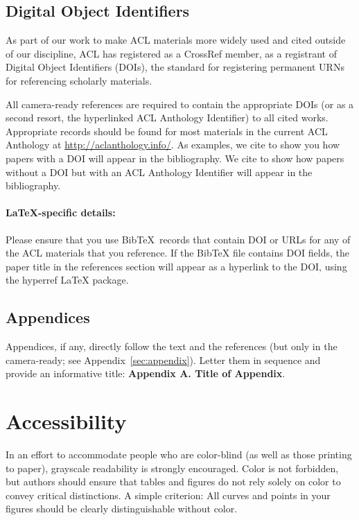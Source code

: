 \documentclass[11pt,a4paper]{article}
\begin{document}
\subsection{Digital Object Identifiers}
As part of our work to make ACL materials more widely used and cited outside of our discipline, ACL has registered as a CrossRef member, as a registrant of Digital Object Identifiers (DOIs), the standard for registering permanent URNs for referencing scholarly materials.

All camera-ready references are required to contain the appropriate DOIs (or as a second resort, the hyperlinked ACL Anthology Identifier) to all cited works.
Appropriate records should be found for most materials in the current ACL Anthology at \url{http://aclanthology.info/}.
As examples, we cite \citep{goodman-etal-2016-noise} to show you how papers with a DOI will appear in the bibliography.
We cite \citep{harper-2014-learning} to show how papers without a DOI but with an ACL Anthology Identifier will appear in the bibliography.

\paragraph{\LaTeX-specific details:}
Please ensure that you use Bib\TeX\ records that contain DOI or URLs for any of the ACL materials that you reference.
If the Bib\TeX{} file contains DOI fields, the paper title in the references section will appear as a hyperlink to the DOI, using the hyperref \LaTeX{} package.


\subsection{Appendices}
Appendices, if any, directly follow the text and the
references (but only in the camera-ready; see Appendix~\ref{sec:appendix}).
Letter them in sequence and provide an informative title:
\textbf{Appendix A. Title of Appendix}.

\section{Accessibility}
\label{ssec:accessibility}

In an effort to accommodate people who are color-blind (as well as those printing to paper), grayscale readability is strongly encouraged.
Color is not forbidden, but authors should ensure that tables and figures do not rely solely on color to convey critical distinctions.
A simple criterion:
All curves and points in your figures should be clearly distinguishable without color.
\end{document}
